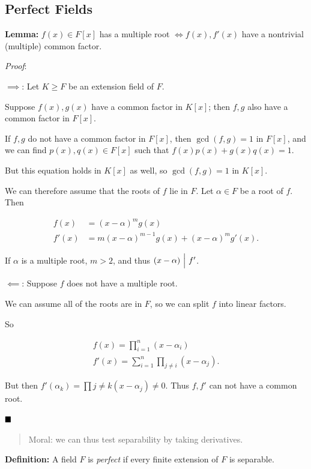 \hypertarget{perfect-fields}{%
\subsection{Perfect Fields}\label{perfect-fields}}

\textbf{Lemma:} \(f(x) \in F[x]\) has a multiple root
\(\iff f(x), f'(x)\) have a nontrivial (multiple) common factor.

\emph{Proof}:

\(\implies\): Let \(K\geq F\) be an extension field of \(F\).

Suppose \(f(x), g(x)\) have a common factor in \(K[x]\); then \(f,g\)
also have a common factor in \(F[x]\).

If \(f, g\) do not have a common factor in \(F[x]\), then
\(\gcd(f, g) = 1\) in \(F[x]\), and we can find \(p(x), q(x) \in F[x]\)
such that \(f(x)p(x) + g(x)q(x) = 1\).

But this equation holds in \(K[x]\) as well, so \(\gcd(f, g) = 1\) in
\(K[x]\).

We can therefore assume that the roots of \(f\) lie in \(F\). Let
\(\alpha\in F\) be a root of \(f\). Then

\begin{align*}
f(x)  &= (x-\alpha)^m g(x) \\
f'(x) &= m(x-\alpha)^{m-1} g(x) + (x-\alpha)^m g'(x)
.\end{align*}

If \(\alpha\) is a multiple root, \(m > 2\), and thus
\((x-\alpha) {~\Bigm| ~} f'\).

\(\impliedby\): Suppose \(f\) does not have a multiple root.

We can assume all of the roots are in \(F\), so we can split \(f\) into
linear factors.

So

\begin{align*}
f(x) = \prod_{i=1}^n (x-\alpha_i) \\
f'(x) = \sum_{i=1}^n \prod_{j\neq i} (x-\alpha_j)
.\end{align*}

But then \(f'(\alpha_k) = \prod{j\neq k} (x - \alpha_j) \neq 0\). Thus
\(f, f'\) can not have a common root.

\(\qed\)

\begin{quote}
Moral: we can thus test separability by taking derivatives.
\end{quote}

\textbf{Definition:} A field \(F\) is \emph{perfect} if every finite
extension of \(F\) is separable.

